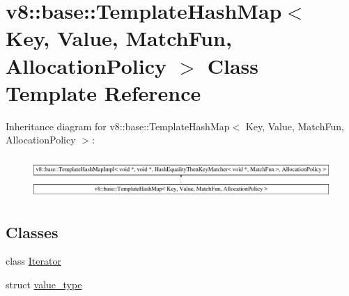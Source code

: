 \hypertarget{classv8_1_1base_1_1TemplateHashMap}{}\section{v8\+:\+:base\+:\+:Template\+Hash\+Map$<$ Key, Value, Match\+Fun, Allocation\+Policy $>$ Class Template Reference}
\label{classv8_1_1base_1_1TemplateHashMap}
Inheritance diagram for v8\+:\+:base\+:\+:Template\+Hash\+Map$<$ Key, Value, Match\+Fun, Allocation\+Policy $>$\+:\begin{figure}[H]
\begin{center}
\leavevmode
\includegraphics[height=1.579690cm]{classv8_1_1base_1_1TemplateHashMap}
\end{center}
\end{figure}
\subsection*{Classes}
\begin{DoxyCompactItemize}
\item 
class \mbox{\hyperlink{classv8_1_1base_1_1TemplateHashMap_1_1Iterator}{Iterator}}
\item 
struct \mbox{\hyperlink{structv8_1_1base_1_1TemplateHashMap_1_1value__type}{value\+\_\+type}}
\end{DoxyCompactItemize}
